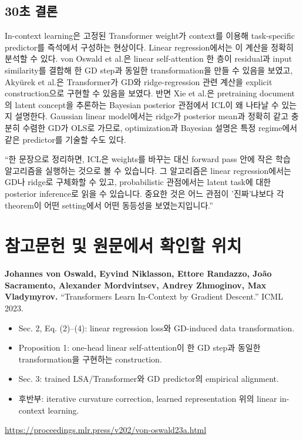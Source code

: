 \documentclass[11pt,a4paper,oneside,openany]{memoir}
\theoremstyle{definition}
\begin{document}
\section{30초 결론}

In-context learning은 고정된 Transformer weight가 context를 이용해 task-specific predictor를 즉석에서 구성하는 현상이다.
Linear regression에서는 이 계산을 정확히 분석할 수 있다. von Oswald et al.은 linear self-attention 한 층이 residual과 input similarity를 결합해 한 GD step과 동일한 transformation을 만들 수 있음을 보였고, Akyürek et al.은 Transformer가 GD와 ridge-regression 관련 계산을 explicit construction으로 구현할 수 있음을 보였다. 반면 Xie et al.은 pretraining document의 latent concept을 추론하는 Bayesian posterior 관점에서 ICL이 왜 나타날 수 있는지 설명한다. Gaussian linear model에서는 ridge가 posterior mean과 정확히 같고 충분히 수렴한 GD가 OLS로 가므로, optimization과 Bayesian 설명은 특정 regime에서 같은 predictor를 기술할 수도 있다.

\begin{presentbox}
``한 문장으로 정리하면, ICL은 weights를 바꾸는 대신 forward pass 안에 작은 학습 알고리즘을 실행하는 것으로 볼 수 있습니다. 그 알고리즘은 linear regression에서는 GD나 ridge로 구체화할 수 있고, probabilistic 관점에서는 latent task에 대한 posterior inference로 읽을 수 있습니다. 중요한 것은 어느 관점이 '진짜'냐보다 각 theorem이 어떤 setting에서 어떤 동등성을 보였는지입니다.''
\end{presentbox}

\chapter*{참고문헌 및 원문에서 확인할 위치}

\textbf{Johannes von Oswald, Eyvind Niklasson, Ettore Randazzo, João Sacramento, Alexander Mordvintsev, Andrey Zhmoginov, Max Vladymyrov.}
``Transformers Learn In-Context by Gradient Descent.'' ICML 2023.

\begin{itemize}
\item Sec. 2, Eq. (2)--(4): linear regression loss와 GD-induced data transformation.
\item Proposition 1: one-head linear self-attention이 한 GD step과 동일한 transformation을 구현하는 construction.
\item Sec. 3: trained LSA/Transformer와 GD predictor의 empirical alignment.
\item 후반부: iterative curvature correction, learned representation 위의 linear in-context learning.
\end{itemize}
\url{https://proceedings.mlr.press/v202/von-oswald23a.html}
\end{document}

